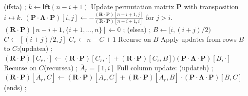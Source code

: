 \documentclass{article}
\newcommand{\mat}[1]{\mathbf{#1}}
\newcommand{\lft}{\mathbf{lft}}
\begin{document}
\begin{algorithm}[h]\caption{Row Algorithm($A = [i,j]$)}
\label{alg:row-tree}
\begin{algorithmic}[1]
      \node (ifsta) {};
        \State $k \gets \lft  (n-i+1)$ 
            \State Update permutation matrix $\mat{P}$ with transposition $i \leftrightarrow k$.
            \State $(\mat{P} \!\cdot \!\mat{\Lambda}\!\cdot\!\mat{P} )[i,j] \gets
        -\frac{(\mat{R}\cdot\mat{P} )[n-i+1,j]}{(\mat{R}\cdot\mat{P})[n-i+1,i]}$ for $j > i$.
            \State $(\mat{R}\!\cdot\!\mat{P})[n-i+1, \{i+1, \ldots,n\}]\gets 0 $ \label{lin:zero-out} ;
    \Else {} \node (elsea) {};
        \State $B \gets [i, (i+j)/2)$ 
        \State $C \gets [(i+j)/2, j]$ 
        \State $C_r \gets n-C+1$ 
        \State Recurse on $B$
        \State Apply updates from rows $B$ to $C$: \node (updatea) {};
        \Statex \qquad $(\mat{R}\!\cdot\!\mat{P} )[C_r,\cdot ] \gets (\mat{R}\!\cdot\!\mat{P} )[C_r, \cdot ]  +
                    (\mat{R}\!\cdot\!\mat{P})[C_r,B]) (\mat{P}\!\cdot\!\mat{\Lambda}\!\cdot\!\mat{P})[B,\cdot]$ 
        \State Recurse on $C$ \node (recursea) {};
        \State $\bar{A}_r = [1,i]$ 
        \State Full column update:   \node (updateb) {};
        \Statex \qquad $(\mat{R}\!\cdot\!\mat{P})[\bar{A}_r, C] \gets
                    (\mat{R}\!\cdot\!\mat{P})[\bar{A}_r, C] + (\mat{R}\!\cdot\!\mat{P})[\bar{A}_r, B] \cdot (\mat{P} \!\cdot\! \mat{\Lambda}\!\cdot\!\mat{P})[B,C]$   
                     \node (ends) {\!\!};
    \EndIf
                \vspace{-0.4cm}
\end{algorithmic}
\end{algorithm}
\end{document}
